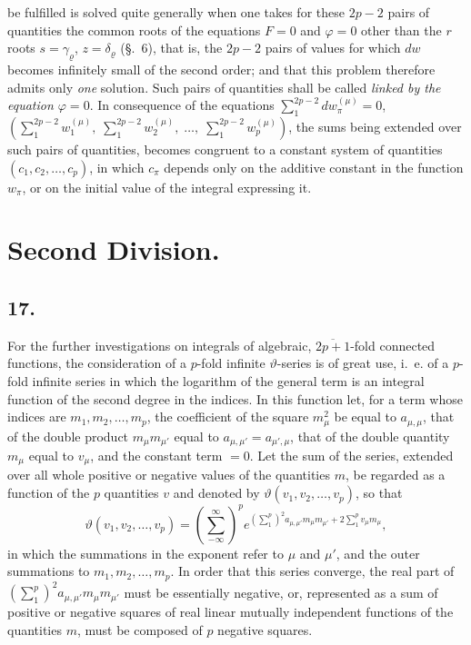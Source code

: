 \documentclass{article}
\begin{document}
be fulfilled is solved quite generally when one takes for these $2p-2$ pairs of quantities the common roots of the equations $F = 0$ and $\varphi = 0$ other than the $r$ roots $s = \gamma_{\varrho}$, $z = \delta_{\varrho}$ (§.~6), that is, the $2p-2$ pairs of values for which $dw$ becomes infinitely small of the second order; and that this problem therefore admits only \emph{one} solution. Such pairs of quantities shall be called \emph{linked by the equation $\varphi = 0$}. In consequence of the equations $\displaystyle\sum_{1}^{2p-2} dw_{\pi}^{(\mu)} = 0$, $\left(\displaystyle\sum_{1}^{2p-2} w_{1}^{(\mu)}, \; \sum_{1}^{2p-2} w_{2}^{(\mu)}, \; \ldots, \; \sum_{1}^{2p-2} w_{p}^{(\mu)}\right)$, the sums being extended over such pairs of quantities, becomes congruent to a constant system of quantities $(c_{1}, c_{2}, \ldots, c_{p})$, in which $c_{\pi}$ depends only on the additive constant in the function $w_{\pi}$, or on the initial value of the integral expressing it.

\section*{Second Division.}

\subsection*{17.}

For the further investigations on integrals of algebraic, $\overline{2p+1}$-fold connected functions, the consideration of a $p$-fold infinite $\vartheta$-series is of great use, i.~e. of a $p$-fold infinite series in which the logarithm of the general term is an integral function of the second degree in the indices. In this function let, for a term whose indices are $m_{1}, m_{2}, \ldots, m_{p}$, the coefficient of the square $m_{\mu}^{2}$ be equal to $a_{\mu,\mu}$, that of the double product $m_{\mu} m_{\mu'}$ equal to $a_{\mu,\mu'} = a_{\mu',\mu}$, that of the double quantity $m_{\mu}$ equal to $v_{\mu}$, and the constant term $= 0$. Let the sum of the series, extended over all whole positive or negative values of the quantities $m$, be regarded as a function of the $p$ quantities $v$ and denoted by $\vartheta(v_{1}, v_{2}, \ldots, v_{p})$, so that
\[ \vartheta(v_{1}, v_{2}, \ldots, v_{p}) = \left(\sum_{-\infty}^{\infty}\right)^{p} e^{\left(\sum_{1}^{p}\right)^{2} a_{\mu,\mu'} m_{\mu} m_{\mu'} + 2 \sum_{1}^{p} v_{\mu} m_{\mu}}, \tag{1.} \]
in which the summations in the exponent refer to $\mu$ and $\mu'$, and the outer summations to $m_{1}, m_{2}, \ldots, m_{p}$. In order that this series converge, the real part of $\left(\displaystyle\sum_{1}^{p}\right)^{2} a_{\mu,\mu'} m_{\mu} m_{\mu'}$ must be essentially negative, or, represented as a sum of positive or negative squares of real linear mutually independent functions of the quantities $m$, must be composed of $p$ negative squares.
\end{document}
